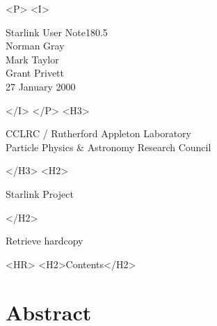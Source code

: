 \documentclass[twoside,11pt]{article}
\newcommand{\stardoccategory}  {Starlink User Note}
\newcommand{\stardocsource}    {sun\stardocnumber}
\newcommand{\stardocnumber}    {180.5}
\newcommand{\stardocauthors}   {Norman Gray\\Mark Taylor\\Grant Privett}
\newcommand{\stardocdate}      {27 January 2000}
\newcommand{\htmladdnormallink}[2]{#1}
\newcommand{\htmladdimg}[1]{}
\newcommand{\htmlref}[2]{#1}
\newcommand{\htmladdtonavigation}[1]{}
\newcommand{\xlabel}[1]{}
\newcommand{\latexonlytoc}[0]{\tableofcontents}
\begin{document}
\begin{htmlonly}
   \begin{rawhtml} <P> <I> \end{rawhtml}
   \stardoccategory \stardocnumber \\
   \stardocauthors \\
   \stardocdate
   \begin{rawhtml} </I> </P> <H3> \end{rawhtml}
      \htmladdnormallink{CCLRC}{http://www.cclrc.ac.uk} /
      \htmladdnormallink{Rutherford Appleton Laboratory}
                        {http://www.cclrc.ac.uk/ral} \\
      \htmladdnormallink{Particle Physics \& Astronomy Research Council}
                        {http://www.pparc.ac.uk} \\
   \begin{rawhtml} </H3> <H2> \end{rawhtml}
      \htmladdnormallink{Starlink Project}{http://star-www.rl.ac.uk/}
   \begin{rawhtml} </H2> \end{rawhtml}
   \htmladdnormallink{\htmladdimg{source.gif} Retrieve hardcopy}
      {http://star-www.rl.ac.uk/cgi-bin/hcserver?\stardocsource}\\

  \label{stardoccontents}
  \begin{rawhtml}
    <HR>
    <H2>Contents</H2>
  \end{rawhtml}
  \renewcommand{\latexonlytoc}[0]{}
  \htmladdtonavigation{\htmlref{\htmladdimg{contents_motif.gif}}
        {stardoccontents}}

  \section{\xlabel{abstract}Abstract}
\end{htmlonly}
\end{document}
